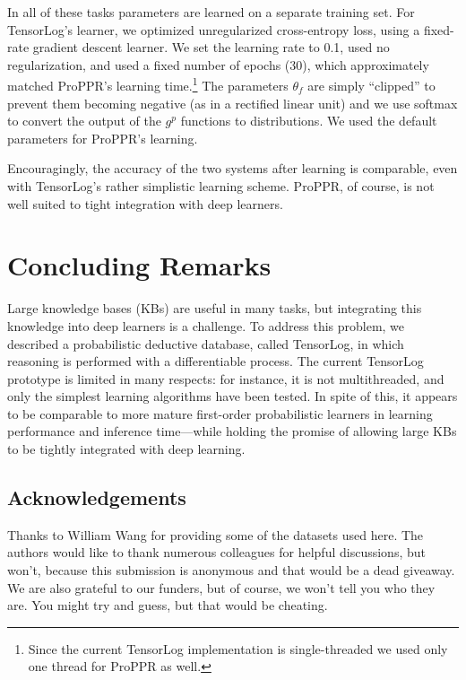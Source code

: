 \documentclass{article}
\begin{document}
In all of these tasks parameters are learned on a separate training
set.  For TensorLog's learner, we optimized unregularized
cross-entropy loss, using a fixed-rate gradient descent learner.  We
set the learning rate to 0.1, used no regularization, and used a fixed
number of epochs (30), which approximately matched ProPPR's learning
time.\footnote{Since the current TensorLog implementation is
  single-threaded we used only one thread for ProPPR as well.}  The
parameters $\theta_f$ are simply ``clipped'' to prevent them becoming
negative (as in a rectified linear unit) and we use softmax to convert
the output of the $g^p$ functions to distributions.  We used the
default parameters for ProPPR's learning.

Encouragingly, the accuracy of the two systems after learning is
comparable, even with TensorLog's rather simplistic learning scheme.
ProPPR, of course, is not well suited to tight integration with deep
learners.

\section{Concluding Remarks}

Large knowledge bases (KBs) are useful in many tasks, but integrating
this knowledge into deep learners is a challenge.  To address this
problem, we described a probabilistic deductive database, called
TensorLog, in which reasoning is performed with a differentiable
process.  The current TensorLog prototype is limited in many respects:
for instance, it is not multithreaded, and only the simplest learning
algorithms have been tested.  In spite of this, it appears to be
comparable to more mature first-order probabilistic learners in
learning performance and inference time---while holding the promise of
allowing large KBs to be tightly integrated with deep learning.

\subsection*{Acknowledgements}

Thanks to William Wang for providing some of the datasets used here.
The authors would like to thank numerous colleagues for helpful
discussions, but won't, because this submission is anonymous and that
would be a dead giveaway.  We are also grateful to our funders, but of
course, we won't tell you who they are.  You might try and guess, but
that would be cheating.


\newpage


  
% 
\end{document}
